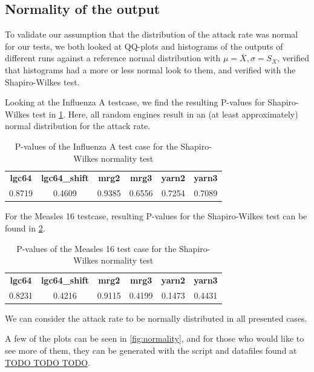 \documentclass{acmart}
\begin{document}
\subsection{Normality of the output}
\label{par:normality}
To validate our assumption that the distribution of the attack rate was normal for our tests, we both looked at QQ-plots and histograms of the outputs of different runs against a reference normal distribution with $\mu = \bar{X}, \sigma=S_X$, verified that histograms had a more or less normal look to them, and verified with the Shapiro-Wilkes test.

Looking at the Influenza A testcase, we find the resulting P-values for Shapiro-Wilkes test in \cref{tab:influenza_a:shapiro}. Here, all random engines result in an (at least approximately) normal distribution for the attack rate.
\begin{table}[!hbt]
    \begin{tabular}{c c c c c c}
       \textbf{lgc64} & \textbf{lgc64\_shift} & \textbf{mrg2} & \textbf{mrg3} & \textbf{yarn2} & \textbf{yarn3}\\
        0.8719 & 0.4609 & 0.9385 & 0.6556 & 0.7254 & 0.7089
    \end{tabular}
    \caption{P-values of the Influenza A test case for the Shapiro-Wilkes normality test}
    \label{tab:influenza_a:shapiro}
\end{table}


For the Measles 16 testcase, resulting P-values for the Shapiro-Wilkes test can be found in \cref{tab:measles_16:shapiro}.

\begin{table}[!hbt]
    \begin{tabular}{c c c c c c}
       \textbf{lgc64} & \textbf{lgc64\_shift} & \textbf{mrg2} & \textbf{mrg3} & \textbf{yarn2} & \textbf{yarn3}\\
        0.8231 & 0.4216 & 0.9115 & 0.4199 & 0.1473 & 0.4431
    \end{tabular}
    \caption{P-values of the Measles 16 test case for the Shapiro-Wilkes normality test}
    \label{tab:measles_16:shapiro}
\end{table}

We can consider the attack rate to be normally distributed in all presented cases.

A few of the plots can be seen in \cref{fig:normality}, and for those who would like to see more of them, they can be generated with the script and datafiles found at \url{TODO TODO TODO}. %
\end{document}
